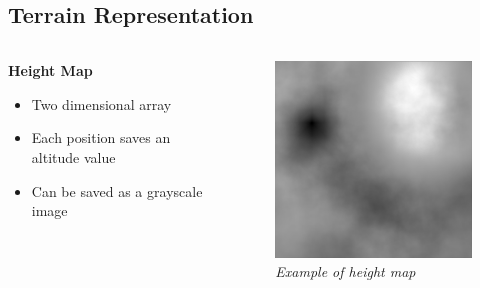 \documentclass[aspectratio=169]{beamer}
\newenvironment{myframe}[1][t]{\begin{frame}[#1]{\secname}{\subsecname}}{\end{frame}}
\begin{document}
	\subsection{Terrain Representation}
	
	\begin{myframe}
		\begin{columns}[T]
			\begin{column}{0.45 \linewidth}
				\textbf{Height Map}
				\begin{itemize}
					\item Two dimensional array
					\item Each position saves an altitude value
					\item Can be saved as a grayscale image
				\end{itemize}
			\end{column}
			\begin{column}{0.45 \linewidth}
				\vspace{-0.5cm}
				\begin{figure}[c]
					\centering
					\includegraphics[width=0.7\linewidth]{images/background/representation/heightmap} \\
					\scriptsize\textit{Example of height map}
				\end{figure}
			\end{column}
		\end{columns}
	\end{myframe}
	
\end{document}
